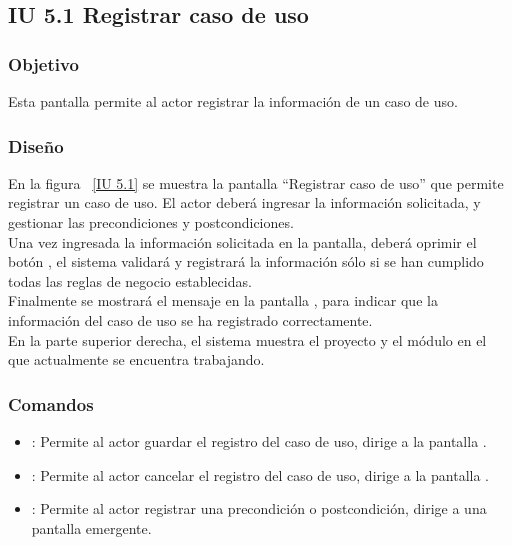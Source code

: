 \newpage 
\subsection{IU 5.1 Registrar caso de uso}

\subsubsection{Objetivo}
	
	Esta pantalla permite al actor registrar la información de un caso de uso.

\subsubsection{Diseño}

    En la figura ~\ref{IU 5.1} se muestra la pantalla ``Registrar caso de uso'' que permite registrar un caso de uso. El actor deberá ingresar la información solicitada, y gestionar las precondiciones y postcondiciones.\\
    
    
    Una vez ingresada la información solicitada en la pantalla, deberá oprimir el botón , el sistema validará y registrará la información sólo si se han cumplido todas las reglas de negocio establecidas.  \\
    
    Finalmente se mostrará el mensaje  en la pantalla , para indicar que la información del caso de uso se ha registrado correctamente.\\

	En la parte superior derecha, el sistema muestra el proyecto y el módulo en el que actualmente se encuentra trabajando.

    


\subsubsection{Comandos}
\begin{itemize}
	\item {}: Permite al actor guardar el registro del caso de uso, dirige a la pantalla .
	\item {}: Permite al actor cancelar el registro del caso de uso, dirige a la pantalla .
	\item \btnRegistrar: Permite al actor registrar una precondición o postcondición, dirige a una pantalla emergente.
\end{itemize}

